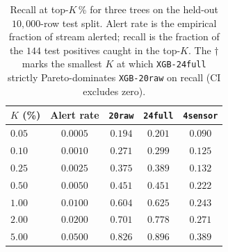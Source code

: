 \documentclass{article}
\begin{document}
\begin{table}[t]
\centering
\small
\caption{Recall at top-$K$\,\% for three trees on the held-out
$10{,}000$-row test split. Alert rate is the empirical fraction of stream
alerted; recall is the fraction of the $144$ test positives caught in the
top-$K$. The $\dagger$ marks the smallest $K$ at which \texttt{XGB-24full}
strictly Pareto-dominates \texttt{XGB-20raw} on recall (CI excludes zero).}
\label{tab:p8-alert-volume}
\begin{tabular}{lcccc}
\toprule
$K$ (\%) & Alert rate & \texttt{20raw} & \texttt{24full} & \texttt{4sensor} \\
\midrule
$0.05$  & $0.0005$ & $0.194$ & $0.201$ & $0.090$ \\
$0.10$  & $0.0010$ & $0.271$ & $0.299$ & $0.125$ \\
$0.25$  & $0.0025$ & $0.375$ & $0.389$ & $0.132$ \\
$0.50$  & $0.0050$ & $0.451$ & $0.451$ & $0.222$ \\
$1.00$  & $0.0100$ & $0.604$ & $0.625$ & $0.243$ \\
$2.00$  & $0.0200$ & $0.701$ & $0.778$ & $0.271$ \\
$5.00$  & $0.0500$ & $0.826$ & $0.896$ & $0.389$ \\
\bottomrule
\end{tabular}
\end{table}
\end{document}
